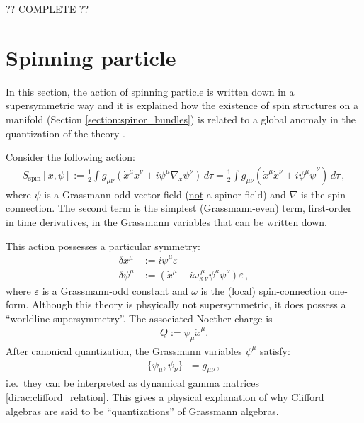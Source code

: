     ?? COMPLETE ??

\section{Spinning particle}

    In this section, the action of spinning particle is written down in a supersymmetric way \cite{spinning_particle} and it is explained how the existence of spin structures on a manifold (Section \ref{section:spinor_bundles}) is related to a global anomaly in the quantization of the theory \cite{witten_string_structure}.

    Consider the following action:
    \begin{gather}
        S_\mathrm{spin}[x,\psi] := \frac{1}{2}\int g_{\mu\nu}\left(\dot{x}^\mu\dot{x}^\nu + i\psi^\mu\nabla_{\dot{x}}\psi^\nu\right)\,d\tau = \frac{1}{2}\int g_{\mu\nu}\left(\dot{x}^\mu\dot{x}^\nu + i\psi^\mu\dot{\psi}^\nu\right)\,d\tau\,,
    \end{gather}
    where $\psi$ is a Grassmann-odd vector field (\underline{not} a spinor field) and $\nabla$ is the spin connection. The second term is the simplest (Grassmann-even) term, first-order in time derivatives, in the Grassmann variables that can be written down.

    This action possesses a particular symmetry:
    \begin{align}
        \delta x^\mu &:= i\psi^\mu\varepsilon\\
        \delta\psi^\mu &:= \left(\dot{x}^\mu - i\omega^{\ \mu\ }_{\kappa\ \nu}\psi^\kappa\psi^\nu\right)\varepsilon\,,
    \end{align}
    where $\varepsilon$ is a Grassmann-odd constant and $\omega$ is the (local) spin-connection one-form. Although this theory is phsyically not supersymmetric, it does possess a ``worldline supersymmetry''. The associated Noether charge is
    \begin{gather}
        Q := \psi_\mu\dot{x}^\mu.
    \end{gather}
    After canonical quantization, the Grassmann variables $\psi^\mu$ satisfy:
    \begin{gather}
        \{\psi_\mu,\psi_\nu\}_+ = g_{\mu\nu}\,,
    \end{gather}
    i.e.~they can be interpreted as dynamical gamma matrices \eqref{dirac:clifford_relation}. This gives a physical explanation of why Clifford algebras are said to be ``quantizations'' of Grassmann algebras.

